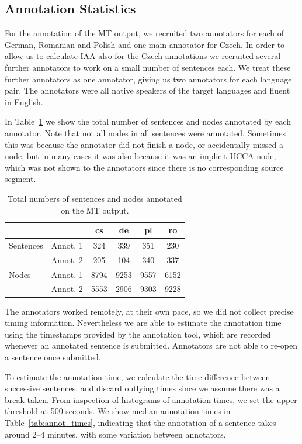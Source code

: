 \documentclass[11pt]{article}
\newcommand{\tabref}[1]{Table~\ref{#1}}
\begin{document}
\subsection{Annotation Statistics}
\label{sec:annot_stats}

For the annotation of the MT output, we recruited two annotators for each of German, Romanian
and Polish and one main annotator for Czech. In order to allow us to calculate IAA also for
the Czech annotations we recruited several further annotators to work on a small number of 
sentences each. We treat these further annotators as one annotator, giving us two annotators
for each language pair.
The annotators were all native  speakers of the target languages and fluent in English.

In \tabref{tab:annot}
we show the total number of sentences and nodes annotated by each annotator. Note that not all nodes in all sentences were annotated. Sometimes this was because the
annotator did not finish a node, or accidentally missed a node, but in many cases it was also because it was an implicit 
UCCA node, which was not shown to the annotators since there is no corresponding source segment.
\begin{table}
\begin{center}
{\small
\begin{tabular}{ll|cccc}
& & cs & de & pl & ro \\
\hline
Sentences &  Annot. 1 & 324   & 339  & 351  & 230  \\
 & Annot. 2 & 205 & 104  & 340  & 337 \\
\hline
Nodes & Annot. 1 & 8794  & 9253 & 9557  & 6152 \\
 &Annot. 2 & 5553 & 2906  & 9303  & 9228  \\
\end{tabular}
}
\caption{Total numbers of sentences and nodes annotated on the MT output.}
\label{tab:annot}
\end{center}
\end{table}

The annotators worked remotely, at their own pace, so we did not collect precise timing
information. Nevertheless we are able to estimate the annotation time using the timestamps
provided by the annotation tool, which are recorded whenever an annotated sentence is
submitted. Annotators are not able to re-open a sentence once submitted. 

To estimate the annotation time, we calculate the time difference between successive 
sentences, and discard outlying times since we assume there was a break taken. From inspection
of histograms of annotation times, we set the upper threshold at 500 seconds. We
show median annotation times in Table~\ref{tab:annot_times}, indicating that the annotation
of a sentence takes around 2--4 minutes, with some variation between annotators.
\end{document}
